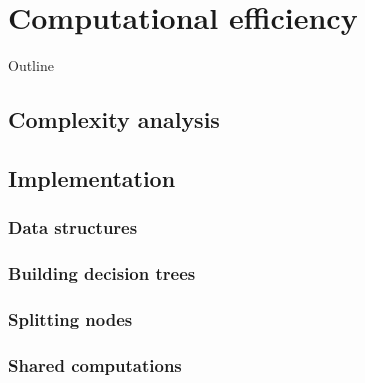 \chapter{Computational efficiency}\label{ch:complexity}

\begin{remark}{Outline}
\end{remark}

\section{Complexity analysis}


\section{Implementation}


\subsection{Data structures}


\subsection{Building decision trees}


\subsection{Splitting nodes}


\subsection{Shared computations}

